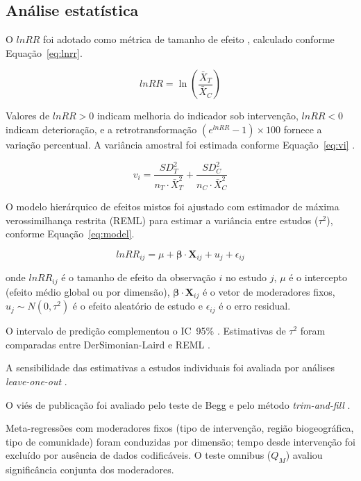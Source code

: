 \documentclass[12pt,a4paper]{article}
\begin{document}
\subsection{Análise estatística}
\label{sec:stats}

O $lnRR$ foi adotado como métrica de tamanho de efeito \citep{Hedges1999}, calculado conforme Equação~\ref{eq:lnrr}.

\begin{equation}
lnRR = \ln\left(\frac{\bar{X}_{T}}{\bar{X}_{C}}\right)
\label{eq:lnrr}
\end{equation}

\noindent Valores de $lnRR > 0$ indicam melhoria do indicador sob intervenção, $lnRR < 0$ indicam deterioração, e a retrotransformação $(e^{lnRR} - 1) \times 100$ fornece a variação percentual. A variância amostral foi estimada conforme Equação~\ref{eq:vi} \citep{Hedges1999}.

\begin{equation}
v_i = \frac{SD_T^2}{n_T \cdot \bar{X}_T^2} + \frac{SD_C^2}{n_C \cdot \bar{X}_C^2}
\label{eq:vi}
\end{equation}

O modelo hierárquico de efeitos mistos foi ajustado com estimador de máxima verossimilhança restrita (REML) para estimar a variância entre estudos ($\tau^2$), conforme Equação~\ref{eq:model}.

\begin{equation}
lnRR_{ij} = \mu + \bm{\beta} \cdot \mathbf{X}_{ij} + u_j + \epsilon_{ij}
\label{eq:model}
\end{equation}

\noindent onde $lnRR_{ij}$ é o tamanho de efeito da observação $i$ no estudo $j$, $\mu$ é o intercepto (efeito médio global ou por dimensão), $\bm{\beta} \cdot \mathbf{X}_{ij}$ é o vetor de moderadores fixos, $u_j \sim N(0, \tau^2)$ é o efeito aleatório de estudo e $\epsilon_{ij}$ é o erro residual.

O intervalo de predição complementou o IC~95\% \citep{IntHout2016}. Estimativas de $\tau^2$ foram comparadas entre DerSimonian-Laird e REML \citep{Borenstein2009}.

A sensibilidade das estimativas a estudos individuais foi avaliada por análises \textit{leave-one-out} \citep{Viechtbauer2010}.

O viés de publicação foi avaliado pelo teste de Begg \citep{Begg1994} e pelo método \textit{trim-and-fill} \citep{Duval2000}.

Meta-regressões com moderadores fixos (tipo de intervenção, região biogeográfica, tipo de comunidade) foram conduzidas por dimensão; tempo desde intervenção foi excluído por ausência de dados codificáveis. O teste omnibus ($Q_M$) avaliou significância conjunta dos moderadores.
\end{document}
